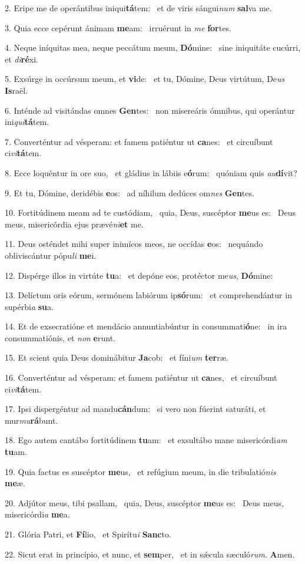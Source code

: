 2. Eripe me de operántibus iniqui\textbf{tá}tem: \ast\  et de viris sángui\textit{num} \textbf{sal}va me.\

3. Quia ecce cepérunt ánimam \textbf{me}am: \ast\  irruérunt in \textit{me} \textbf{for}tes.\

4. Neque iníquitas mea, neque peccátum meum, \textbf{Dó}mine: \ast\  sine iniquitáte cucúrri, et \textit{di}\textbf{ré}xi.\

5. Exsúrge in occúrsum meum, et \textbf{vi}de: \ast\  et tu, Dómine, Deus virtútum, De\textit{us} \textbf{Is}raël.\

6. Inténde ad visitándas omnes \textbf{Gen}tes: \ast\  non misereáris ómnibus, qui operántur ini\textit{qui}\textbf{tá}tem.\

7. Converténtur ad vésperam: et famem patiéntur ut \textbf{ca}nes: \ast\  et circuíbunt ci\textit{vi}\textbf{tá}tem.\

8. Ecce loquéntur in ore suo, \dag\  et gládius in lábiis e\textbf{ó}rum: \ast\  quóniam quis \textit{au}\textbf{dí}vit?\

9. Et tu, Dómine, deridébis \textbf{e}os: \ast\  ad níhilum dedúces om\textit{nes} \textbf{Gen}tes.\

10. Fortitúdinem meam ad te custódiam, \dag\  quia, Deus, suscéptor \textbf{me}us es: \ast\  Deus meus, misericórdia ejus prævé\textit{ni}\textbf{et} me.\

11. Deus osténdet mihi super inimícos meos, ne occídas \textbf{e}os: \ast\  nequándo obliviscántur pópu\textit{li} \textbf{me}i.\

12. Dispérge illos in virtúte \textbf{tu}a: \ast\  et depóne eos, protéctor me\textit{us}, \textbf{Dó}mine:\

13. Delíctum oris eórum, sermónem labiórum ip\textbf{só}rum: \ast\  et comprehendántur in supérbi\textit{a} \textbf{su}a.\

14. Et de exsecratióne et mendácio annuntiabúntur in consummati\textbf{ó}ne: \ast\  in ira consummatiónis, et \textit{non} \textbf{e}runt.\

15. Et scient quia Deus dominábitur \textbf{Ja}cob: \ast\  et fíni\textit{um} \textbf{ter}ræ.\

16. Converténtur ad vésperam: et famem patiéntur ut \textbf{ca}nes, \ast\  et circuíbunt ci\textit{vi}\textbf{tá}tem.\

17. Ipsi dispergéntur ad mandu\textbf{cán}dum: \ast\  si vero non fúerint saturáti, et mur\textit{mu}\textbf{rá}bunt.\

18. Ego autem cantábo fortitúdinem \textbf{tu}am: \ast\  et exsultábo mane misericórdi\textit{am} \textbf{tu}am.\

19. Quia factus es suscéptor \textbf{me}us, \ast\  et refúgium meum, in die tribulatió\textit{nis} \textbf{me}æ.\

20. Adjútor meus, tibi psallam, \dag\  quia, Deus, suscéptor \textbf{me}us es: \ast\  Deus meus, misericórdi\textit{a} \textbf{me}a.\

21. Glória Patri, et \textbf{Fí}lio, \ast\  et Spirítu\textit{i} \textbf{Sanc}to.\

22. Sicut erat in princípio, et nunc, et \textbf{sem}per, \ast\  et in sǽcula sæculó\textit{rum}. \textbf{A}men.\

